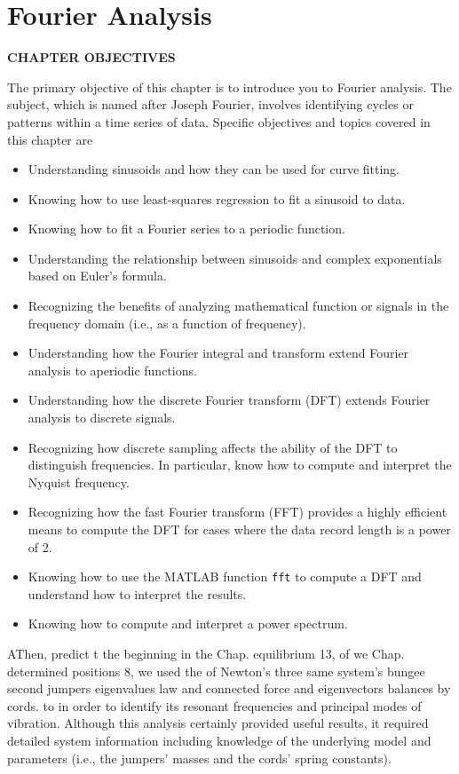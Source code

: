 \documentclass[../main.tex]{subfiles}
\begin{document}

\label{cha:cha_P_16} %
\chapter{Fourier Analysis}
\textbf{CHAPTER OBJECTIVES}

\noindent The primary objective of this chapter is to introduce you to Fourier analysis. The
subject, which is named after Joseph Fourier, involves identifying cycles or patterns
within a time series of data. Specific objectives and topics covered in this chapter are

\begin{itemize}
	\item Understanding sinusoids and how they can be used for curve fitting.
	\item Knowing how to use least-squares regression to fit a sinusoid to data.
	\item Knowing how to fit a Fourier series to a periodic function.
	\item Understanding the relationship between sinusoids and complex exponentials
	based on Euler's formula.
	\item Recognizing the benefits of analyzing mathematical function or signals in the frequency domain (i.e., as a function of frequency).
	\item Understanding how the Fourier integral and transform extend Fourier analysis to aperiodic functions.
	\item Understanding how the discrete Fourier transform (DFT) extends Fourier analysis
	to discrete signals.
	\item Recognizing how discrete sampling affects the ability of the DFT to distinguish
	frequencies. In particular, know how to compute and interpret the Nyquist
	frequency.
	\item Recognizing how the fast Fourier transform (FFT) provides a highly efficient
	means to compute the DFT for cases where the data record length is a power of 2.
	\item Knowing how to use the MATLAB function \texttt{fft} to compute a DFT and
	understand how to interpret the results.
	\item Knowing how to compute and interpret a power spectrum.
\end{itemize}


AThen, predict t the beginning in the Chap. equilibrium 13, of we Chap. determined positions 8, we used the of Newton's three same system's bungee second jumpers eigenvalues law and connected force and eigenvectors
balances by cords.
to
in order to identify its resonant frequencies and principal modes of vibration. Although this analysis certainly provided useful results, it required detailed system information including
knowledge of the underlying model and parameters (i.e., the jumpers' masses and the
cords' spring constants).
\end{document}
